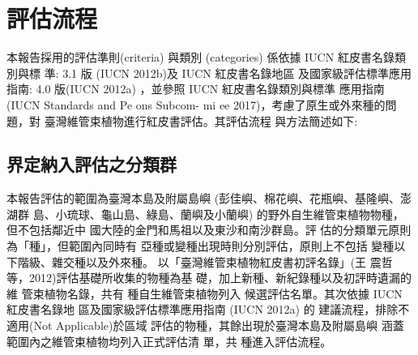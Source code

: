 \chapter{評估流程}
\begin{multicols}{2}

本報告採用的評估準則(criteria) 與類別 (categories) 係依據 IUCN 紅皮書名錄類別與標 準: 3.1 版 (IUCN 2012b)及 IUCN 紅皮書名錄地區 及國家級評估標準應用指南: 4.0 版(IUCN 2012a) ，並參照 IUCN 紅皮書名錄類別與標準 應用指南 (IUCN Standards and Pe  ons Subcom- mi ee 2017)，考慮了原生或外來種的問題，對 臺灣維管束植物進行紅皮書評估。其評估流程 與方法簡述如下:
\end{multicols}
\section{界定納入評估之分類群}
\begin{multicols}{2}
本報告評估的範圍為臺灣本島及附屬島嶼 (彭佳嶼、棉花嶼、花瓶嶼、基隆嶼、澎湖群 島、小琉球、龜山島、綠島、蘭嶼及小蘭嶼) 的野外自生維管束植物物種，但不包括鄰近中 國大陸的金門和馬祖以及東沙和南沙群島。評 估的分類單元原則為「種」，但範圍內同時有 亞種或變種出現時則分別評估，原則上不包括 變種以下階級、雜交種以及外來種。
以「臺灣維管束植物紅皮書初評名錄」(王 震哲等，2012)評估基礎所收集的物種為基 礎，加上新種、新紀錄種以及初評時遺漏的維 管束植物名錄，共有 種自生維管束植物列入 候選評估名單。其次依據 IUCN 紅皮書名錄地 區及國家級評估標準應用指南 (IUCN 2012a) 的 建議流程，排除不適用(Not Applicable)於區域 評估的物種，其餘出現於臺灣本島及附屬島嶼 涵蓋範圍內之維管束植物均列入正式評估清 單，共 種進入評估流程。
\end{multicols}

